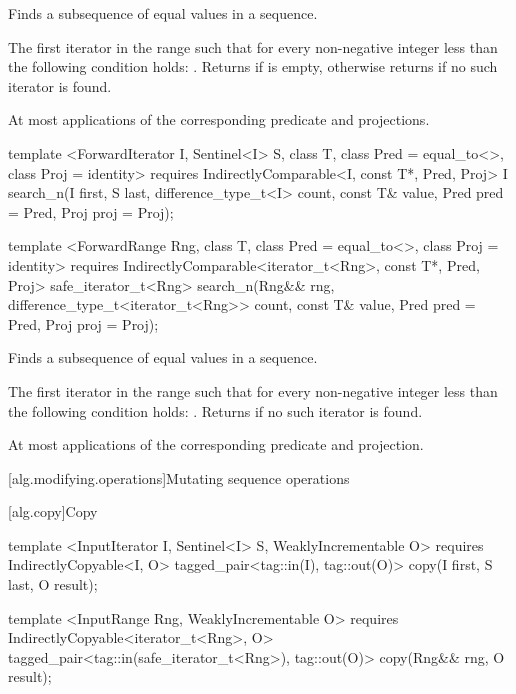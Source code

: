 \begin{itemdescr}
\pnum
\effects
Finds a subsequence of equal values in a sequence.

\pnum
\returns
The first iterator
in the range 
such that for every non-negative integer
less than
the following condition holds:
.
Returns 
if  is empty,
otherwise returns 
if no such iterator is found.

\pnum
\complexity
At most
applications of the corresponding predicate and projections.
\end{itemdescr}

%
\begin{itemdecl}
template <ForwardIterator I, Sentinel<I> S, class T,
    class Pred = equal_to<>, class Proj = identity>
  requires IndirectlyComparable<I, const T*, Pred, Proj>
  I
    search_n(I first, S last, difference_type_t<I> count,
             const T& value, Pred pred = Pred{},
             Proj proj = Proj{});

template <ForwardRange Rng, class T, class Pred = equal_to<>,
    class Proj = identity>
  requires IndirectlyComparable<iterator_t<Rng>, const T*, Pred, Proj>
  safe_iterator_t<Rng>
    search_n(Rng&& rng, difference_type_t<iterator_t<Rng>> count,
             const T& value, Pred pred = Pred{}, Proj proj = Proj{});
\end{itemdecl}

\begin{itemdescr}
\pnum
\effects
Finds a subsequence of equal values in a sequence.

\pnum
\returns
The first iterator
in the range 
such that for every non-negative integer
less than
the following condition holds:
.
Returns 
if no such iterator is found.

\pnum
\complexity
At most
applications of the corresponding predicate and projection.
\end{itemdescr}

[alg.modifying.operations]{Mutating sequence operations}

[alg.copy]{Copy}

%
\begin{itemdecl}
template <InputIterator I, Sentinel<I> S, WeaklyIncrementable O>
  requires IndirectlyCopyable<I, O>
  tagged_pair<tag::in(I), tag::out(O)>
    copy(I first, S last, O result);

template <InputRange Rng, WeaklyIncrementable O>
  requires IndirectlyCopyable<iterator_t<Rng>, O>
  tagged_pair<tag::in(safe_iterator_t<Rng>), tag::out(O)>
    copy(Rng&& rng, O result);
\end{itemdecl}

